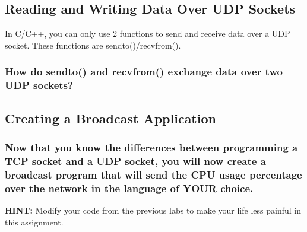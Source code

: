 \documentclass{article}
\begin{document}
	\begin{Large}
		\subsection{\textbf{Reading and Writing Data Over UDP Sockets}}
	\end{Large}
	
	In C/C++, you can only use 2 functions to send and receive data over a UDP socket. These functions are sendto()/recvfrom(). 
	
	\subsubsection{How do sendto() and recvfrom() exchange data over two UDP sockets?}
	\vspace{108pt}
	
	\begin{Large}
		\subsection{\textbf{Creating a Broadcast Application}}
	\end{Large}
	
	\subsubsection{Now that you know the differences between programming a TCP socket and a UDP socket, you will now create a broadcast program that will send the CPU usage percentage over the network in the language of YOUR choice.}
	\textbf{HINT:} Modify your code from the previous labs to make your life less painful in this assignment.
	
	
\end{document}
